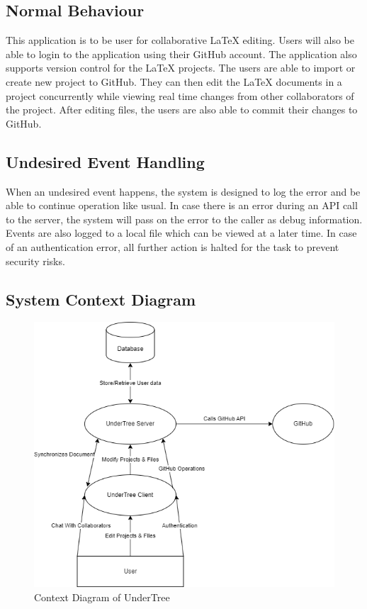 \documentclass[12pt, titlepage]{article}
\begin{document}
	\subsection{Normal Behaviour}
	
	This application is to be user for collaborative LaTeX editing. Users will also be able to login to the application using their GitHub account. The application also supports version control for the LaTeX projects. The users are able to import or create new project to GitHub. They can then edit the LaTeX documents in a project concurrently while viewing real time changes from other collaborators of the project. After editing files, the users are also able to commit their changes to GitHub. 
	
	\subsection{Undesired Event Handling}
	
	When an undesired event happens, the system is designed to log the error and be able to continue operation like usual. In case there is an error during an API call to the server, the system will pass on the error to the caller as debug information. Events are also logged to a local file which can be viewed at a later time. In case of an authentication error, all further action is halted for the task to prevent security risks.
	
	\subsection{System Context Diagram}
	
	\begin{figure}[H]
		\centering
		\includegraphics[scale=0.7]{system_context.png}
		\caption{Context Diagram of UnderTree}
	\end{figure}
	
\end{document}
